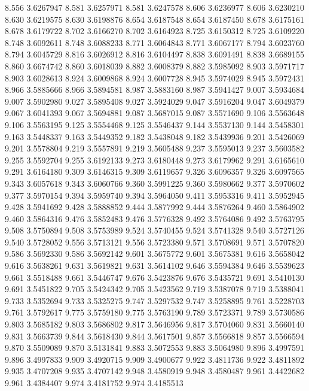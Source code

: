 8.556 3.6267947
8.581 3.6257971
8.581 3.6247578
8.606 3.6236977
8.606 3.6230210
8.630 3.6219575
8.630 3.6198876
8.654 3.6187548
8.654 3.6187450
8.678 3.6175161
8.678 3.6179722
8.702 3.6166270
8.702 3.6164923
8.725 3.6150312
8.725 3.6109220
8.748 3.6092611
8.748 3.6088233
8.771 3.6064843
8.771 3.6067177
8.794 3.6023760
8.794 3.6045729
8.816 3.6026912
8.816 3.6104497
8.838 3.6091491
8.838 3.6689155
8.860 3.6674742
8.860 3.6018039
8.882 3.6008379
8.882 3.5985092
8.903 3.5971717
8.903 3.6028613
8.924 3.6009868
8.924 3.6007728
8.945 3.5974029
8.945 3.5972431
8.966 3.5885666
8.966 3.5894581
8.987 3.5883160
8.987 3.5941427
9.007 3.5934684
9.007 3.5902980
9.027 3.5895408
9.027 3.5924029
9.047 3.5916204
9.047 3.6049379
9.067 3.6041393
9.067 3.5694881
9.087 3.5687015
9.087 3.5571690
9.106 3.5563648
9.106 3.5563195
9.125 3.5554468
9.125 3.5546437
9.144 3.5537130
9.144 3.5458301
9.163 3.5448337
9.163 3.5449352
9.182 3.5438048
9.182 3.5439936
9.201 3.5426069
9.201 3.5578804
9.219 3.5557891
9.219 3.5605488
9.237 3.5595013
9.237 3.5603582
9.255 3.5592704
9.255 3.6192133
9.273 3.6180448
9.273 3.6179962
9.291 3.6165610
9.291 3.6164180
9.309 3.6146315
9.309 3.6119657
9.326 3.6096357
9.326 3.6097565
9.343 3.6057618
9.343 3.6060766
9.360 3.5991225
9.360 3.5980662
9.377 3.5970602
9.377 3.5970154
9.394 3.5959740
9.394 3.5964050
9.411 3.5953316
9.411 3.5952945
9.428 3.5941692
9.428 3.5888852
9.444 3.5877992
9.444 3.5876264
9.460 3.5864902
9.460 3.5864316
9.476 3.5852483
9.476 3.5776328
9.492 3.5764086
9.492 3.5763795
9.508 3.5750894
9.508 3.5753989
9.524 3.5740455
9.524 3.5741328
9.540 3.5727126
9.540 3.5728052
9.556 3.5713121
9.556 3.5723380
9.571 3.5708691
9.571 3.5707820
9.586 3.5692330
9.586 3.5692142
9.601 3.5675772
9.601 3.5675381
9.616 3.5658042
9.616 3.5638261
9.631 3.5619821
9.631 3.5614102
9.646 3.5594384
9.646 3.5539623
9.661 3.5518488
9.661 3.5446747
9.676 3.5423876
9.676 3.5435721
9.691 3.5410130
9.691 3.5451822
9.705 3.5424342
9.705 3.5423562
9.719 3.5387078
9.719 3.5388041
9.733 3.5352694
9.733 3.5325275
9.747 3.5297532
9.747 3.5258895
9.761 3.5228703
9.761 3.5792617
9.775 3.5759180
9.775 3.5763190
9.789 3.5723371
9.789 3.5730586
9.803 3.5685182
9.803 3.5686802
9.817 3.5646956
9.817 3.5704060
9.831 3.5660140
9.831 3.5663739
9.844 3.5618430
9.844 3.5617501
9.857 3.5566818
9.857 3.5566594
9.870 3.5509089
9.870 3.5131841
9.883 3.5072553
9.883 3.5064980
9.896 3.4997591
9.896 3.4997833
9.909 3.4920715
9.909 3.4900677
9.922 3.4811736
9.922 3.4811892
9.935 3.4707208
9.935 3.4707142
9.948 3.4580919
9.948 3.4580487
9.961 3.4422682
9.961 3.4384407
9.974 3.4181752
9.974 3.4185513
